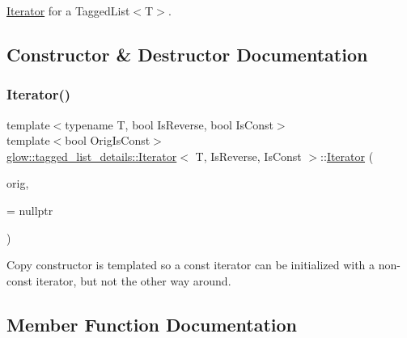 \hyperlink{classglow_1_1tagged__list__details_1_1_iterator}{Iterator} for a Tagged\+List$<$\+T$>$. 

\subsection{Constructor \& Destructor Documentation}
\mbox{\label{classglow_1_1tagged__list__details_1_1_iterator_a011e03d00ac0a027f807f7524f94cda8}} 
\subsubsection{\texorpdfstring{Iterator()}{Iterator()}}
{\footnotesize\ttfamily template$<$typename T, bool Is\+Reverse, bool Is\+Const$>$ \\
template$<$bool Orig\+Is\+Const$>$ \\
\hyperlink{classglow_1_1tagged__list__details_1_1_iterator}{glow\+::tagged\+\_\+list\+\_\+details\+::\+Iterator}$<$ T, Is\+Reverse, Is\+Const $>$\+::\hyperlink{classglow_1_1tagged__list__details_1_1_iterator}{Iterator} (\begin{DoxyParamCaption}\item[{const \hyperlink{classglow_1_1tagged__list__details_1_1_iterator}{Iterator}$<$ T, Is\+Reverse, Orig\+Is\+Const $>$ \&}]{orig,  }\item[{typename std\+::enable\+\_\+if$<$ Is\+Const$\vert$$\vert$!Orig\+Is\+Const, void $\ast$$>$\+::type}]{ = {\ttfamily nullptr} }\end{DoxyParamCaption})\hspace{0.3cm}{\ttfamily [inline]}}

Copy constructor is templated so a const iterator can be initialized with a non-\/const iterator, but not the other way around. 

\subsection{Member Function Documentation}
\mbox{\label{classglow_1_1tagged__list__details_1_1_iterator_a582ecf91ea38bfe45e5dd09cc255acfc}} 
